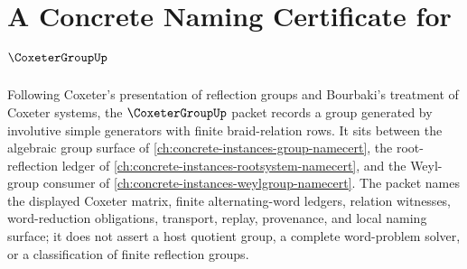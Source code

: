 \chapter{A Concrete Naming Certificate for $\CoxeterGroupUp$}
\label{ch:concrete-instances-coxeter-group-namecert}

Following Coxeter's presentation of reflection groups and Bourbaki's treatment of Coxeter systems, the $\CoxeterGroupUp$ packet records a group generated by involutive simple generators with finite braid-relation rows. It sits between the algebraic group surface of \autoref{ch:concrete-instances-group-namecert}, the root-reflection ledger of \autoref{ch:concrete-instances-rootsystem-namecert}, and the Weyl-group consumer of \autoref{ch:concrete-instances-weylgroup-namecert}. The packet names the displayed Coxeter matrix, finite alternating-word ledgers, relation witnesses, word-reduction obligations, transport, replay, provenance, and local naming surface; it does not assert a host quotient group, a complete word-problem solver, or a classification of finite reflection groups.

